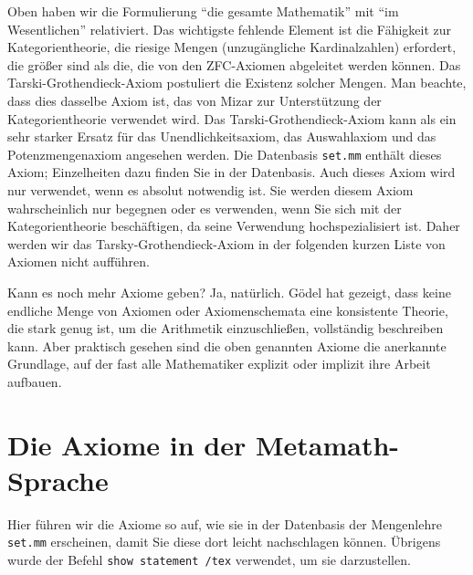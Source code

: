 Oben haben wir die Formulierung "`die gesamte Mathematik"' mit "`im Wesentlichen"' relativiert. Das wichtigste fehlende Element ist die Fähigkeit zur Kategorientheorie, die riesige Mengen (unzugängliche Kardinalzahlen) erfordert, die größer sind als die, die von den ZFC-Axiomen abgeleitet werden können. Das Tarski-Grothendieck-Axiom postuliert die Existenz solcher Mengen. Man beachte, dass dies dasselbe Axiom ist, das von Mizar zur Unterstützung der Kategorientheorie verwendet wird. Das Tarski-Grothendieck-Axiom kann als ein sehr starker Ersatz für das Unendlichkeitsaxiom, das Auswahlaxiom und das Potenzmengenaxiom angesehen werden. Die Datenbasis \texttt{set.mm} enthält dieses Axiom; Einzelheiten dazu finden Sie in der Datenbasis. Auch dieses Axiom wird nur verwendet, wenn es absolut notwendig ist. Sie werden diesem Axiom wahrscheinlich nur begegnen oder es verwenden, wenn Sie sich mit der Kategorientheorie beschäftigen, da seine Verwendung hochspezialisiert ist. Daher werden wir das Tarsky-Grothendieck-Axiom in der folgenden kurzen Liste von Axiomen nicht aufführen.

Kann es noch mehr Axiome geben? Ja, natürlich. G\"{o}del hat gezeigt, dass keine endliche Menge von Axiomen oder Axiomenschemata eine konsistente Theorie, die stark genug ist, um die Arithmetik einzuschließen, vollständig beschreiben kann. Aber praktisch gesehen sind die oben genannten Axiome die anerkannte Grundlage, auf der fast alle Mathematiker explizit oder implizit ihre Arbeit aufbauen.

\section{Die Axiome in der Metamath-Sprache}\label{metaaxioms}

Hier führen wir die Axiome so auf, wie sie in der Datenbasis der Mengenlehre \texttt{set.mm} erscheinen, damit Sie diese dort leicht nachschlagen können.  Übrigens wurde der Befehl \texttt{show statement /tex} verwendet, um sie darzustellen.

\newbox\mlinebox
\newbox\mtrialbox
\newbox\startprefix  %
\newbox\contprefix  %
\def\startm{  %
  \setbox\mlinebox=\hbox{\unhcopy\startprefix}
}
\def\m#1{  %
  \setbox\mtrialbox=\hbox{\unhcopy\mlinebox $\,#1$}
  \ifdim\wd\mtrialbox>\hsize
    \box\mlinebox
    \setbox\mlinebox=\hbox{\unhcopy\contprefix $\,#1$}
  \else
    \setbox\mlinebox=\hbox{\unhbox\mtrialbox}
  \fi
}
\def\endm{  %
  \box\mlinebox
}

